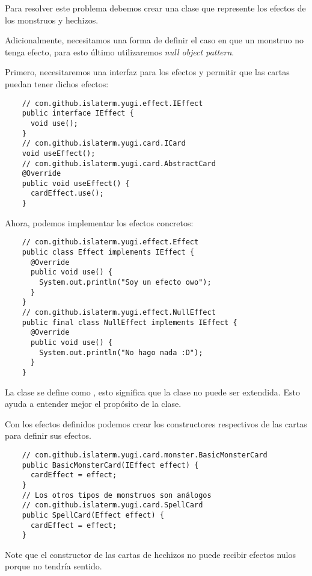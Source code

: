 \begin{Answer}[ref={ex:null-1}]
  Para resolver este problema debemos crear una clase que represente los efectos de los
  monstruos y hechizos.
  
  Adicionalmente, necesitamos una forma de definir el caso en que un monstruo no tenga 
  efecto, para esto último utilizaremos \textit{null object pattern}.
  
  Primero, necesitaremos una interfaz para los efectos y permitir que las cartas puedan
  tener dichos efectos:
  \begin{verbatim}
    // com.github.islaterm.yugi.effect.IEffect
    public interface IEffect {
      void use();
    }
    // com.github.islaterm.yugi.card.ICard
    void useEffect();
    // com.github.islaterm.yugi.card.AbstractCard
    @Override
    public void useEffect() {
      cardEffect.use();
    }      
  \end{verbatim}

  Ahora, podemos implementar los efectos concretos:
  \begin{verbatim}
    // com.github.islaterm.yugi.effect.Effect
    public class Effect implements IEffect {
      @Override
      public void use() {
        System.out.println("Soy un efecto owo");
      }
    }
    // com.github.islaterm.yugi.effect.NullEffect  
    public final class NullEffect implements IEffect {
      @Override
      public void use() {
        System.out.println("No hago nada :D");
      }
    }
  \end{verbatim}
  La clase  se define como , esto significa que la clase no
  puede ser extendida.
  Esto ayuda a entender mejor el propósito de la clase.
  
  Con los efectos definidos podemos crear los constructores respectivos de las cartas 
  para definir sus efectos.
  \begin{verbatim}
    // com.github.islaterm.yugi.card.monster.BasicMonsterCard
    public BasicMonsterCard(IEffect effect) {
      cardEffect = effect;
    }
    // Los otros tipos de monstruos son análogos
    // com.github.islaterm.yugi.card.SpellCard
    public SpellCard(Effect effect) {
      cardEffect = effect;
    }
  \end{verbatim}

  Note que el constructor de las cartas de hechizos no puede recibir efectos nulos 
  porque no tendría sentido.
\end{Answer}